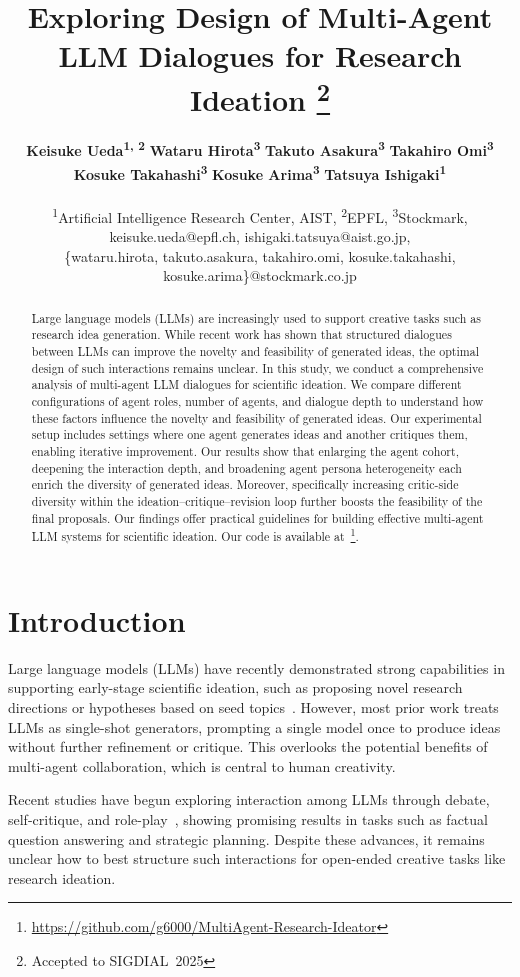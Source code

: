 \documentclass[11pt]{article}
\title{Exploring Design of Multi-Agent LLM Dialogues for Research Ideation%
  \thanks{Accepted to SIGDIAL~2025}}
\author{
  \textbf{Keisuke Ueda\textsuperscript{1, 2}}
  \textbf{Wataru Hirota\textsuperscript{3}}
  \textbf{Takuto Asakura\textsuperscript{3}}
  \textbf{Takahiro Omi\textsuperscript{3}}
  \\
  \textbf{Kosuke Takahashi\textsuperscript{3}}
  \textbf{Kosuke Arima\textsuperscript{3}}
  \textbf{Tatsuya Ishigaki\textsuperscript{1}}
  \\
  \\
  \textsuperscript{1}Artificial Intelligence Research Center, AIST,
  \textsuperscript{2}EPFL,
  \textsuperscript{3}Stockmark,
  \\
  \small{keisuke.ueda@epfl.ch,}
  \small{ishigaki.tatsuya@aist.go.jp,}
  \\
  \small{\{wataru.hirota, takuto.asakura, takahiro.omi, kosuke.takahashi, kosuke.arima\}@stockmark.co.jp}
}
\begin{document}
\maketitle

\begin{abstract}
Large language models (LLMs) are increasingly used to support creative tasks such as research idea generation. While recent work has shown that structured dialogues between LLMs can improve the novelty and feasibility of generated ideas, the optimal design of such interactions remains unclear. In this study, we conduct a comprehensive analysis of multi-agent LLM dialogues for scientific ideation. We compare different configurations of agent roles, number of agents, and dialogue depth to understand how these factors influence the novelty and feasibility of generated ideas. Our experimental setup includes settings where one agent generates ideas and another critiques them, enabling iterative improvement. Our results show that enlarging the agent cohort, deepening the interaction depth, and broadening agent persona heterogeneity each enrich the diversity of generated ideas.  Moreover, specifically increasing critic-side diversity within the ideation–critique–revision loop further boosts the feasibility of the final proposals. Our findings offer practical guidelines for building effective multi-agent LLM systems for scientific ideation.
Our code is available at~\footnote{\url{https://github.com/g6000/MultiAgent-Research-Ideator}}.
\end{abstract}

\section{Introduction}

Large language models (LLMs) have recently demonstrated strong capabilities in supporting early-stage scientific ideation, such as proposing novel research directions or hypotheses based on seed topics~\cite{si2025can, wang2024scimon}. However, most prior work treats LLMs as single-shot generators, prompting a single model once to produce ideas without further refinement or critique. This overlooks the potential benefits of multi-agent collaboration, which is central to human creativity.

Recent studies have begun exploring interaction among LLMs through debate, self-critique, and role-play~\cite{li2023camel, du2023llmdebate, park2023generative}, showing promising results in tasks such as factual question answering and strategic planning. Despite these advances, it remains unclear how to best structure such interactions for open-ended creative tasks like research ideation.
\end{document}
